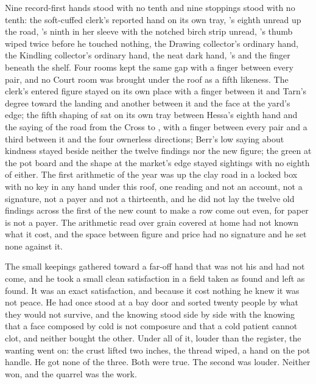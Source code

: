 Nine record-first hands stood with no tenth and nine stoppings stood with no tenth: the soft-cuffed clerk's reported hand on its own tray, 's eighth unread up the road, 's ninth in her sleeve with the notched birch strip unread, 's thumb wiped twice before he touched nothing, the Drawing collector's ordinary hand, the Kindling collector's ordinary hand, the neat dark hand, 's and the finger beneath the shelf. Four rooms kept the same gap with a finger between every pair, and no Court room was brought under the roof as a fifth likeness. The clerk's entered figure stayed on its own place with a finger between it and Tarn's degree toward the landing and another between it and the face at the yard's edge; the fifth shaping of  sat on its own tray between Hessa's eighth hand and the saying of the road from the Cross to , with a finger between every pair and a third between it and the four ownerless directions; Berr's low saying about kindness stayed beside neither the twelve findings nor the new figure; the green at the pot board and the shape at the market's edge stayed sightings with no eighth of either. The first arithmetic of the year was up the clay road in a locked box with no key in any hand under this roof, one reading and not an account, not a signature, not a payer and not a thirteenth, and he did not lay the twelve old findings across the first of the new count to make a row come out even, for paper is not a payer. The arithmetic read over grain covered at home had not known what it cost, and the space between figure and price had no signature and he set none against it.

The small keepings gathered toward a far-off hand that was not his and had not come, and he took a small clean satisfaction in a field taken as found and left as found. It was an exact satisfaction, and because it cost nothing he knew it was not peace. He had once stood at a bay door and sorted twenty people by what they would not survive, and the knowing stood side by side with the knowing that a face composed by cold is not composure and that a cold patient cannot clot, and neither bought the other. Under all of it, louder than the register, the wanting went on: the crust lifted two inches, the thread wiped, a hand on the pot handle. He got none of the three. Both were true. The second was louder. Neither won, and the quarrel was the work.

